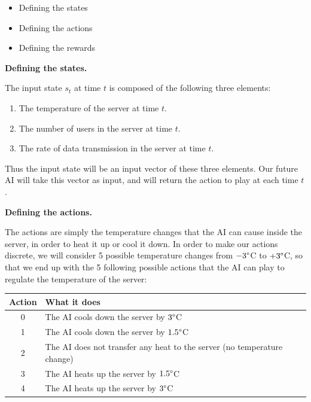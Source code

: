 \documentclass[]{book}
\begin{document}
\begin{itemize}
    \item Defining the states
    \item Defining the actions
    \item Defining the rewards
\end{itemize}

\textbf{Defining the states.}

The input state \(s_t\) at time \(t\) is composed of the following three elements:

\begin{enumerate}
    \item The temperature of the server at time $t$.
    \item The number of users in the server at time $t$.
    \item The rate of data transmission in the server at time $t$.
\end{enumerate}

Thus the input state will be an input vector of these three elements. Our future AI will take this vector as input, and will return the action to play at each time \(t\).

\textbf{Defining the actions.}

The actions are simply the temperature changes that the AI can cause inside the server, in order to heat it up or cool it down. In order to make our actions discrete, we will consider 5 possible temperature changes from \(-3 \degree\)C to \(+3 \degree\)C, so that we end up with the 5 following possible actions that the AI can play to regulate the temperature of the server:

\begin{table}[h!]
  \begin{center}
    \begin{tabular}{c|l}
      \textbf{Action} & \textbf{What it does} \\
      \hline
      0 & The AI cools down the server by $3 \degree$C \\
      1 & The AI cools down the server by $1.5 \degree$C \\
      2 & The AI does not transfer any heat to the server (no temperature change) \\
      3 & The AI heats up the server by $1.5 \degree$C \\
      4 & The AI heats up the server by $3 \degree$C \\
    \end{tabular}
  \end{center}
\end{table}
\end{document}
